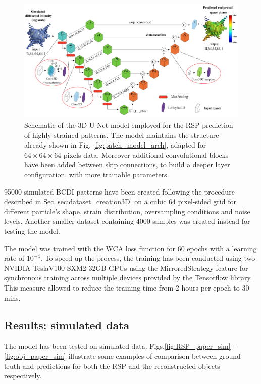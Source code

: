 \begin{figure}[H]
    \centering
    \includegraphics[width=\textwidth]{figures/Phasing/Architecture-1.pdf}
    \caption{Schematic of the 3D U-Net model employed for the RSP prediction of highly strained patterns. The model maintains 
    the structure already shown in Fig. \ref{fig:patch_model_arch}, adapted for $64\times64\times64$ pixels data. Moreover 
    additional convolutional blocks have been added between skip connections, to build a deeper layer configuration, 
    with more trainable parameters. }
    \label{fig:architecture_phasing}
\end{figure}

95000 simulated BCDI patterns have been created following the procedure described in Sec.\ref{sec:dataset_creation3D} 
on a cubic 64 pixel-sided grid for different particle's shape, strain distribution, oversampling conditions and noise levels. 
Another smaller dataset containing 4000 samples was created instead for testing the model. 

The model was trained with the WCA loss function for 60 epochs with a learning rate of $10^{-4}$. To speed up the process, 
the training has been conducted using two NVIDIA TeslaV100-SXM2-32GB GPUs using the MirroredStrategy feature for
synchronous training across multiple devices provided by the Tensorflow library. This measure allowed to reduce the training 
time from 2 hours per epoch to 30 mins. 

\subsection{Results: simulated data}\label{chp:phasing_results}

The model has been tested on simulated data. Figs.\ref{fig:RSP_paper_sim} - \ref{fig:obj_paper_sim}
illustrate some examples of comparison between ground truth and predictions for both the RSP and the reconstructed objects 
respectively. 

